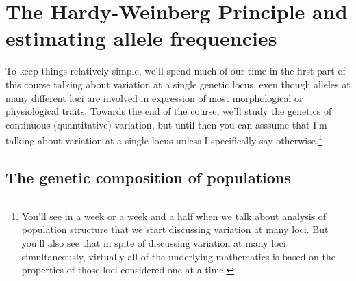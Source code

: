 \chapter{The Hardy-Weinberg Principle and estimating allele frequencies}

To keep things relatively simple, we'll spend much of our time in the
first part of this course talking about variation at a single genetic
locus, even though alleles at many different loci are involved in
expression of most morphological or physiological traits. Towards the
end of the course, we'll study the genetics of continuous
(quantitative) variation, but until then you can asssume that I'm
talking about variation at a single locus unless I specifically say
otherwise.\footnote{You'll see in a week or a week and a half when we
  talk about analysis of population structure that we start discussing
  variation at many loci. But you'll also see that in spite of
  discussing variation at many loci simultaneously, virtually all of
  the underlying mathematics is based on the properties of those loci
  considered one at a time.}

\section*{The genetic composition of populations}

